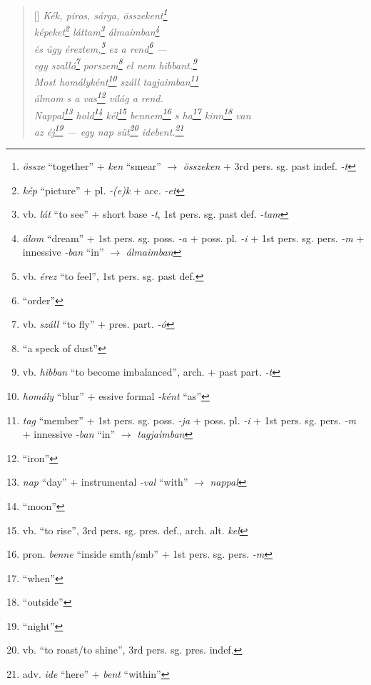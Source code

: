 \documentclass[a4paper,12pt,twoside,final]{book}
\begin{document}

\newpage

\settowidth{\versewidth}{Nappal hold kél bennem s ha kinn van}

\begin{verse}[\versewidth]
  \it
  Kék, piros, sárga, összekent\footnote{\emph{össze} ``together'' +
  \emph{ken} ``smear'' $\rightarrow$ \emph{összeken} + 3rd
  pers. sg. past indef. \emph{-t}} \\
  képeket\footnote{\emph{kép} ``picture'' + pl. \emph{-(e)k} +
  acc. \emph{-et}} láttam\footnote{vb. \emph{lát} ``to see'' +
  short base \emph{-t}, 1st pers. sg. past def. \emph{-tam}}
  álmaimban\footnote{\emph{álom} ``dream'' +
  1st pers. sg. poss. \emph{-a} + poss. pl. \emph{-i} + 1st
  pers. sg. pers. \emph{-m} + innessive \emph{-ban} ``in'' $\rightarrow$
  \emph{álmaimban}} \\
  és úgy éreztem,\footnote{vb. \emph{érez} ``to feel'', 1st
  pers. sg. past def.} ez a rend\footnote{``order''} --- \\
  egy szalló\footnote{vb. \emph{száll} ``to fly'' +
  pres. part. \emph{-ó}} porszem\footnote{``a speck of dust''} el nem
  hibbant.\footnote{vb. \emph{hibban}
  ``to become imbalanced'', arch. + past part. \emph{-t}} \\
  Most homályként\footnote{\emph{homály} ``blur'' +
  essive formal \emph{-ként} ``as''} száll tagjaimban\footnote{\emph{tag}
  ``member'' + 1st pers. sg. poss. \emph{-ja} +
  poss. pl. \emph{-i} + 1st pers. sg. pers. \emph{-m} +
  innessive \emph{-ban} ``in'' $\rightarrow$ \emph{tagjaimban}} \\
  álmom s a vas\footnote{``iron''} világ a rend. \\
  Nappal\footnote{\emph{nap} ``day'' + instrumental \emph{-val}
  ``with'' $\rightarrow$ \emph{nappal}} hold\footnote{``moon''}
  kél\footnote{vb. ``to rise'', 3rd pers. sg. pres. def.,
  arch. alt. \emph{kel}} bennem\footnote{pron. \emph{benne} ``inside
  smth/smb'' + 1st pers. sg. pers. \emph{-m}} s ha\footnote{``when''}
  kinn\footnote{``outside''} van  \\
  az éj\footnote{``night''} --- egy nap süt\footnote{vb. ``to
  roast/to shine'', 3rd pers. sg. pres. indef.}
  idebent.\footnote{adv. \emph{ide} ``here'' + \emph{bent} ``within''}
\end{verse}
\end{document}
